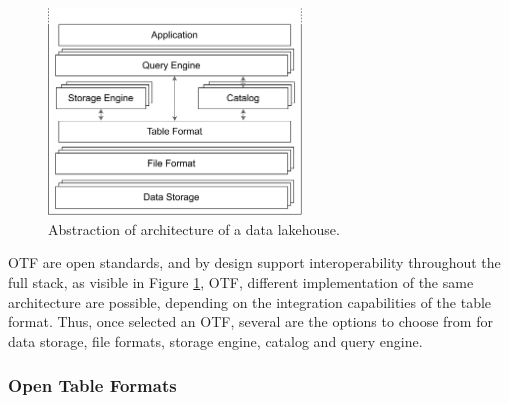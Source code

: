 \begin{figure}[!ht]
    \begin{center}
      \includegraphics[width=0.6\textwidth]{figures/2-background_and_related_work/lakehouse_schema.png}
    \end{center}
    \caption[Architecture of data lakehouse]{Abstraction of architecture of a data lakehouse.}
    \label{fig:lakehouse_schema}
\end{figure}

\gls{OTF} are open standards, and by design support interoperability throughout the full stack, as visible in Figure \ref{fig:lakehouse_schema}, \gls{OTF}, different implementation of the same architecture are possible, depending on the integration capabilities of the table format. Thus, once selected an \gls{OTF}, several are the options to choose from for data storage, file formats, storage engine, catalog and query engine.


\subsubsection*{Open Table Formats}

